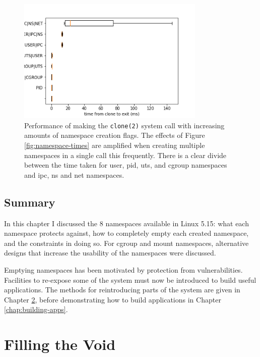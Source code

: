 \documentclass[12pt,a4paper,twoside]{report}
\begin{document}
\begin{figure}
    \centering
    \includegraphics[width=0.8\textwidth]{graphs/clone_stacked_namespaces.png}

    \caption{Performance of making the \texttt{clone(2)} system call with increasing amounts of namespace creation flags. The effects of Figure \ref{fig:namespace-times} are amplified when creating multiple namespaces in a single call this frequently. There is a clear divide between the time taken for user, pid, uts, and cgroup namespaces and ipc, ns and net namespaces.}
    \label{fig:namespace-stacked-times}
\end{figure}

\section{Summary}

In this chapter I discussed the 8 namespaces available in Linux 5.15: what each namespace protects against, how to completely empty each created namespace, and the constraints in doing so. For cgroup and mount namespaces, alternative designs that increase the usability of the namespaces were discussed.

Emptying namespaces has been motivated by protection from vulnerabilities. Facilities to re-expose some of the system must now be introduced to build useful applications. The methods for reintroducing parts of the system are given in Chapter \ref{chap:filling-the-void}, before demonstrating how to build applications in Chapter \ref{chap:building-apps}.


\chapter{Filling the Void}
\label{chap:filling-the-void}
\end{document}
